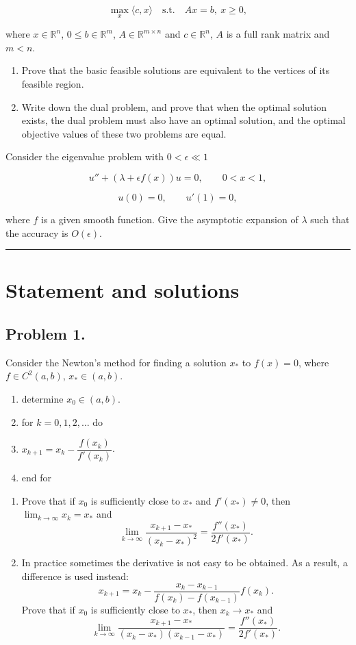 \documentclass[11pt,a4paper]{article}
\newcommand{\examstatement}[1]{%
  \par\addvspace{0.85em}%
  \noindent{\bfseries #1}\par\nobreak\addvspace{0.28em}%
}
\begin{document}
\[
\max_{x} \langle c, x \rangle \quad \text{s.t.} \quad Ax = b,\ x \ge 0,
\]

where \(x \in \mathbb{R}^{n}\), \(0 \le b \in \mathbb{R}^{m}\), \(A \in \mathbb{R}^{m \times n}\) and \(c \in \mathbb{R}^{n}\), \(A\) is a full rank matrix and \(m < n\).
\begin{enumerate}[label=(\arabic*)]
    \item Prove that the basic feasible solutions are equivalent to the vertices of its feasible region.
    \item Write down the dual problem, and prove that when the optimal solution exists, the dual problem must also have an optimal solution, and the optimal objective values of these two problems are equal.
\end{enumerate}

\examstatement{Problem 7.}
Consider the eigenvalue problem with \(0 < \epsilon \ll 1\)

\[
u'' + (\lambda + \epsilon f(x)) u = 0, \qquad 0 < x < 1,
\]

\[
u(0) = 0, \qquad u'(1) = 0,
\]

where \(f\) is a given smooth function. Give the asymptotic expansion of \(\lambda\) such that the accuracy is \(O(\epsilon)\).

\noindent\rule{\linewidth}{0.4pt}

\section{Statement and solutions}

\subsection{Problem 1.}
Consider the Newton's method for finding a solution \(x_{*}\) to \(f(x) = 0\), where \(f \in C^{2}(a, b)\), \(x_{*} \in (a, b)\).
\begin{enumerate}[label=\arabic*:,leftmargin=2em]
    \item determine \(x_{0} \in (a, b)\).
    \item for \(k = 0, 1, 2, \dots\) do
    \item \(x_{k+1} = x_{k} - \dfrac{f(x_{k})}{f'(x_{k})}\).
    \item end for
\end{enumerate}
\begin{enumerate}[label=(\arabic*)]
    \item Prove that if \(x_{0}\) is sufficiently close to \(x_{*}\) and \(f'(x_{*}) \neq 0\), then \(\lim_{k \to \infty} x_{k} = x_{*}\) and
    \[
    \lim_{k \to \infty} \frac{x_{k+1} - x_{*}}{(x_{k} - x_{*})^{2}} = \frac{f''(x_{*})}{2 f'(x_{*})}.
    \]
    \item In practice sometimes the derivative is not easy to be obtained. As a result, a difference is used instead:
    \[
    x_{k+1} = x_{k} - \frac{x_{k} - x_{k-1}}{f(x_{k}) - f(x_{k-1})} f(x_{k}).
    \]
    Prove that if \(x_{0}\) is sufficiently close to \(x_{*}\), then \(x_{k} \to x_{*}\) and
    \[
    \lim_{k \to \infty} \frac{x_{k+1} - x_{*}}{(x_{k} - x_{*})(x_{k-1} - x_{*})} = \frac{f''(x_{*})}{2 f'(x_{*})}.
    \]
\end{enumerate}
\end{document}

